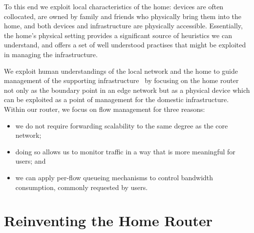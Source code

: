 To this end we exploit local characteristics of the home: devices are often
collocated, are owned by family and friends who physically bring them into the
home, and both devices and infrastructure are physically accessible.
Essentially, the home's physical setting provides a significant source of
heuristics we can understand, and offers a set of well understood practises that
might be exploited in managing the infrastructure.  

We exploit human understandings of the local network and the home to guide
management of the supporting
infrastructure~\cite{crabtree03:_findin_place_ubicom_home} by focusing on the
home router not only as the boundary point in an edge network but as a physical
device which can be exploited as a point of management for the domestic
infrastructure.  Within our router, we focus on flow management for three
reasons: \begin{itemize}
    \item we do not require forwarding scalability to the same degree as the core network; 
    \item doing so allows us to monitor traffic in a way that is more meaningful
      for users; and 
    \item we can apply per-flow queueing mechanisms to control bandwidth
      consumption, commonly requested by users.  \end{itemize}


\section{Reinventing the Home Router} \label{s:router}
 
